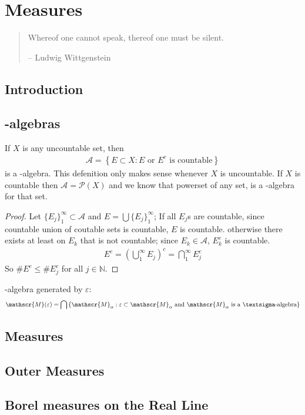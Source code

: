 \chapter{Measures}
\begin{quote}
    Whereof one cannot speak, thereof one must be silent.

    -- Ludwig Wittgenstein
\end{quote}

\section{Introduction}

\section{\textsigma -algebras}
    \begin{note}[page 21]
        If $X$ is any uncountable set, then
        \begin{align*}
            \mathcal{A} = \left\{ E \subset X : \text{$E$ or $E^c$ is countable} \right\}
        \end{align*}
        is a \textsigma-algebra.
        This defenition only makes sense whenever $X$ is uncountable. If $X$ is countable 
        then $\mathcal{A} = \mathscr{P}(X)$ and we know that powerset of any set, 
        is a \textsigma-algebra for that set.
        \begin{proof}
            Let $\{E_j\}_1^\infty \subset \mathcal{A}$ and $E = \bigcup\{E_j\}_1^\infty$; 
            If all $E_j$s are countable, since countable union of coutable sets is countable, 
            $E$ is countable. otherwise there exists at least on $E_k$ that is not countable;
            since $E_k \in \mathcal{A}$, $E_k^c$ is countable.
            \begin{align*}
                E^c = \left(\bigcup_1^\infty E_j\right)^c = \bigcap_1^\infty E_j^c
            \end{align*}
            So $\#E^c \leq \#E_j^c$ for all $j \in \mathbb{N}$.
        \end{proof}
    \end{note}

    \begin{note}[page 22]
        \textsigma-algebra generated by $\varepsilon$:
        \begin{align*}
            \mathscr{M}(\varepsilon) = \bigcap \left\{ \mathscr{M}_\alpha : \text{$\varepsilon \subset \mathscr{M}_\alpha$ and $\mathscr{M}_\alpha$ is a \textsigma-algebra} \right\}
        \end{align*}
    \end{note}

\section{Measures}

\section{Outer Measures}

\section{Borel measures on the Real Line}
